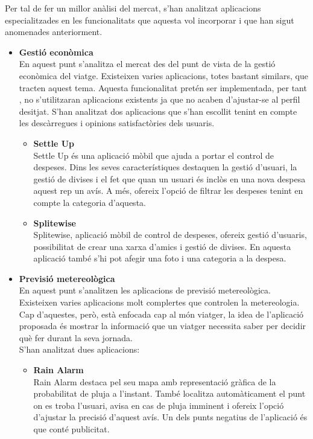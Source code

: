 Per tal de fer un millor anàlisi del mercat, s’han analitzat aplicacions especialitzades en les funcionalitats que aquesta vol incorporar i que han sigut anomenades anteriorment.

\begin{itemize}
\item{\textbf{Gestió econòmica}}\\
En aquest punt s’analitza el mercat des del punt de vista de la gestió econòmica del viatge. Existeixen varies aplicacions, totes bastant similars, que tracten aquest tema.
Aquesta funcionalitat pretén ser implementada, per tant , no s’utilitzaran aplicacions existents ja que no acaben d’ajustar-se al perfil desitjat.
S’han analitzat dos aplicacions que s’han escollit tenint en compte les descàrregues i opinions satisfactòries dels usuaris.
\begin{itemize}
\item{\textbf{Settle Up}}\\
Settle Up és una aplicació mòbil que ajuda a portar el control de despeses. Dins les seves característiques destaquen la gestió d’usuari, la gestió de divises i el fet que quan un usuari és inclòs en una nova despesa aquest rep un avís. A més, ofereix l’opció de filtrar les despeses tenint en compte la categoria d’aquesta.
\item{\textbf{Splitewise}}\\
Splitewise, aplicació mòbil de control de despeses, ofereix gestió d’usuaris, possibilitat de crear una xarxa d’amics i gestió de divises. En aquesta aplicació també s’hi pot afegir una foto i una categoria a la despesa.
\end{itemize}
\item{\textbf{Previsió metereològica}}\\
En aquest punt s’analitzen les aplicacions de previsió metereològica. Existeixen varies aplicacions molt complertes que controlen la metereologia. Cap d’aquestes, però, està enfocada cap al món viatger, la idea de l’aplicació proposada és mostrar la informació que un viatger necessita saber per decidir què fer durant la seva jornada.\\
S’han analitzat dues aplicacions:
\begin{itemize}
\item{\textbf{Rain Alarm}}\\
Rain Alarm destaca pel seu mapa amb representació gràfica de la probabilitat de pluja a l’instant. També localitza automàticament el punt on es troba l’usuari, avisa en cas de pluja imminent i ofereix l’opció d’ajustar la precisió d’aquest avís. Un dels punts negatius de l’aplicació és que conté publicitat.

\end{itemize}
\end{itemize}
